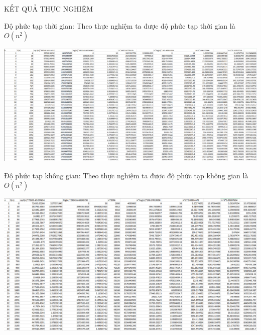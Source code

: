 \documentclass[10pt,a4paper]{article}
\begin{document}
\begin{center}
    \fontsize{30}{30}\selectfont
    KẾT QUẢ THỰC NGHIỆM
\end{center}
\fontsize{14}{20}\selectfont
Độ phức tạp thời gian: Theo thực nghiệm ta được độ phức tạp thời gian là $O(n^2)$
\begin{center}
     \includegraphics[scale=.45]{dpttg.png} \\
\end{center}
\vspace{1 cm}
Độ phức tạp không gian: Theo thực nghiệm ta được độ phức tạp không gian là $O(n^2)$
\begin{center}
     \includegraphics[scale=.5]{dptkg.png} \\
\end{center}
\end{document}
